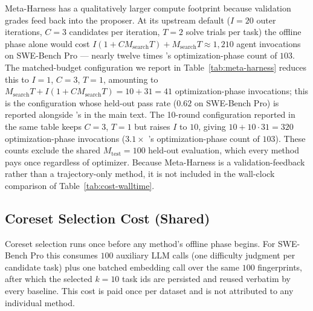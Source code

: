 Meta-Harness has a qualitatively larger compute footprint because validation grades feed back into the proposer.
At its upstream default ($I=20$ outer iterations, $C=3$ candidates per iteration, $T=2$ solve trials per task) the offline phase alone would cost
$I (1 + C M_{\mathrm{search}} T) + M_{\mathrm{search}} T \approx 1{,}210$
agent invocations on SWE-Bench Pro --- nearly twelve times \method{}'s optimization-phase count of $103$.
The matched-budget configuration we report in Table~\ref{tab:meta-harness} reduces this to $I=1$, $C=3$, $T=1$, amounting to $M_{\mathrm{search}} T + I (1 + C M_{\mathrm{search}} T) = 10 + 31 = 41$ optimization-phase invocations; this is the configuration whose held-out pass rate ($0.62$ on SWE-Bench Pro) is reported alongside \method{}'s in the main text.
The 10-round configuration reported in the same table keeps $C=3$, $T=1$ but raises $I$ to $10$, giving $10 + 10 \cdot 31 = 320$ optimization-phase invocations ($3.1\times$ \method{}'s optimization-phase count of $103$).
These counts exclude the shared $M_{\mathrm{test}}=100$ held-out evaluation, which every method pays once regardless of optimizer.
Because Meta-Harness is a validation-feedback rather than a trajectory-only method, it is not included in the wall-clock comparison of Table~\ref{tab:cost-walltime}.

\subsection{Coreset Selection Cost (Shared)}

 Coreset selection runs once before any method's offline phase begins.
For SWE-Bench Pro this consumes $100$ auxiliary LLM calls (one difficulty judgment per candidate task) plus one batched embedding call over the same $100$ fingerprints, after which the selected $k=10$ task ids are persisted and reused verbatim by every baseline.
This cost is paid once per dataset and is not attributed to any individual method.
